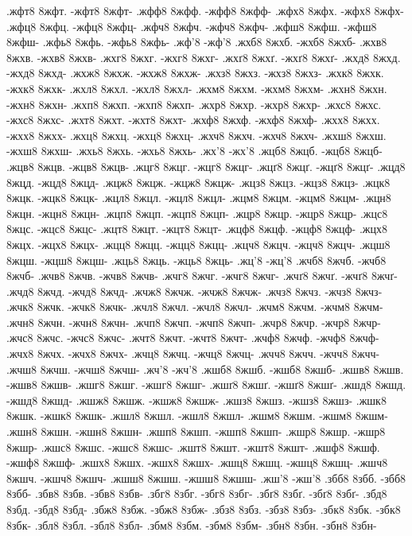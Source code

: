 {.жфт8 8жфт. -жфт8 8жфт-
.жфф8 8жфф. -жфф8 8жфф-
.жфх8 8жфх. -жфх8 8жфх-
.жфц8 8жфц. -жфц8 8жфц-
.жфч8 8жфч. -жфч8 8жфч-
.жфш8 8жфш. -жфш8 8жфш-
.жфь8 8жфь. -жфь8 8жфь-
.жф'8 -жф'8
.жхб8 8жхб. -жхб8 8жхб-
.жхв8 8жхв. -жхв8 8жхв-
.жхг8 8жхг. -жхг8 8жхг-
.жхґ8 8жхґ. -жхґ8 8жхґ-
.жхд8 8жхд. -жхд8 8жхд-
.жхж8 8жхж. -жхж8 8жхж-
.жхз8 8жхз. -жхз8 8жхз-
.жхк8 8жхк. -жхк8 8жхк-
.жхл8 8жхл. -жхл8 8жхл-
.жхм8 8жхм. -жхм8 8жхм-
.жхн8 8жхн. -жхн8 8жхн-
.жхп8 8жхп. -жхп8 8жхп-
.жхр8 8жхр. -жхр8 8жхр-
.жхс8 8жхс. -жхс8 8жхс-
.жхт8 8жхт. -жхт8 8жхт-
.жхф8 8жхф. -жхф8 8жхф-
.жхх8 8жхх. -жхх8 8жхх-
.жхц8 8жхц. -жхц8 8жхц-
.жхч8 8жхч. -жхч8 8жхч-
.жхш8 8жхш. -жхш8 8жхш-
.жхь8 8жхь. -жхь8 8жхь-
.жх'8 -жх'8
.жцб8 8жцб. -жцб8 8жцб-
.жцв8 8жцв. -жцв8 8жцв-
.жцг8 8жцг. -жцг8 8жцг-
.жцґ8 8жцґ. -жцґ8 8жцґ-
.жцд8 8жцд. -жцд8 8жцд-
.жцж8 8жцж. -жцж8 8жцж-
.жцз8 8жцз. -жцз8 8жцз-
.жцк8 8жцк. -жцк8 8жцк-
.жцл8 8жцл. -жцл8 8жцл-
.жцм8 8жцм. -жцм8 8жцм-
.жцн8 8жцн. -жцн8 8жцн-
.жцп8 8жцп. -жцп8 8жцп-
.жцр8 8жцр. -жцр8 8жцр-
.жцс8 8жцс. -жцс8 8жцс-
.жцт8 8жцт. -жцт8 8жцт-
.жцф8 8жцф. -жцф8 8жцф-
.жцх8 8жцх. -жцх8 8жцх-
.жцц8 8жцц. -жцц8 8жцц-
.жцч8 8жцч. -жцч8 8жцч-
.жцш8 8жцш. -жцш8 8жцш-
.жць8 8жць. -жць8 8жць-
.жц'8 -жц'8
.жчб8 8жчб. -жчб8 8жчб-
.жчв8 8жчв. -жчв8 8жчв-
.жчг8 8жчг. -жчг8 8жчг-
.жчґ8 8жчґ. -жчґ8 8жчґ-
.жчд8 8жчд. -жчд8 8жчд-
.жчж8 8жчж. -жчж8 8жчж-
.жчз8 8жчз. -жчз8 8жчз-
.жчк8 8жчк. -жчк8 8жчк-
.жчл8 8жчл. -жчл8 8жчл-
.жчм8 8жчм. -жчм8 8жчм-
.жчн8 8жчн. -жчн8 8жчн-
.жчп8 8жчп. -жчп8 8жчп-
.жчр8 8жчр. -жчр8 8жчр-
.жчс8 8жчс. -жчс8 8жчс-
.жчт8 8жчт. -жчт8 8жчт-
.жчф8 8жчф. -жчф8 8жчф-
.жчх8 8жчх. -жчх8 8жчх-
.жчц8 8жчц. -жчц8 8жчц-
.жчч8 8жчч. -жчч8 8жчч-
.жчш8 8жчш. -жчш8 8жчш-
.жч'8 -жч'8
.жшб8 8жшб. -жшб8 8жшб-
.жшв8 8жшв. -жшв8 8жшв-
.жшг8 8жшг. -жшг8 8жшг-
.жшґ8 8жшґ. -жшґ8 8жшґ-
.жшд8 8жшд. -жшд8 8жшд-
.жшж8 8жшж. -жшж8 8жшж-
.жшз8 8жшз. -жшз8 8жшз-
.жшк8 8жшк. -жшк8 8жшк-
.жшл8 8жшл. -жшл8 8жшл-
.жшм8 8жшм. -жшм8 8жшм-
.жшн8 8жшн. -жшн8 8жшн-
.жшп8 8жшп. -жшп8 8жшп-
.жшр8 8жшр. -жшр8 8жшр-
.жшс8 8жшс. -жшс8 8жшс-
.жшт8 8жшт. -жшт8 8жшт-
.жшф8 8жшф. -жшф8 8жшф-
.жшх8 8жшх. -жшх8 8жшх-
.жшц8 8жшц. -жшц8 8жшц-
.жшч8 8жшч. -жшч8 8жшч-
.жшш8 8жшш. -жшш8 8жшш-
.жш'8 -жш'8
.збб8 8збб. -збб8 8збб-
.збв8 8збв. -збв8 8збв-
.збг8 8збг. -збг8 8збг-
.збґ8 8збґ. -збґ8 8збґ-
.збд8 8збд. -збд8 8збд-
.збж8 8збж. -збж8 8збж-
.збз8 8збз. -збз8 8збз-
.збк8 8збк. -збк8 8збк-
.збл8 8збл. -збл8 8збл-
.збм8 8збм. -збм8 8збм-
.збн8 8збн. -збн8 8збн-
}
